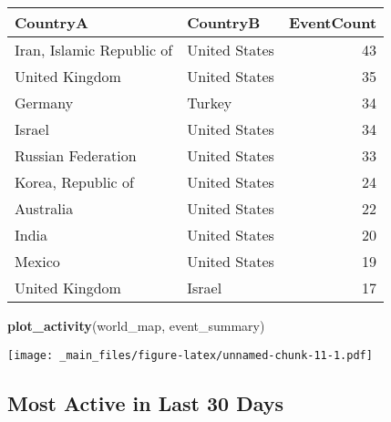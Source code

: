 \documentclass[]{article}
\newenvironment{Shaded}{\begin{snugshade}}{\end{snugshade}}
\newcommand{\KeywordTok}[1]{\textcolor[rgb]{0.13,0.29,0.53}{\textbf{{#1}}}}
\newcommand{\DataTypeTok}[1]{\textcolor[rgb]{0.13,0.29,0.53}{{#1}}}
\newcommand{\DecValTok}[1]{\textcolor[rgb]{0.00,0.00,0.81}{{#1}}}
\newcommand{\StringTok}[1]{\textcolor[rgb]{0.31,0.60,0.02}{{#1}}}
\newcommand{\NormalTok}[1]{{#1}}
\begin{document}
\begin{Shaded}
\end{Shaded}

\begin{tabular}{l|l|r}
\hline
CountryA & CountryB & EventCount\\
\hline
Iran, Islamic Republic of & United States & 43\\
\hline
United Kingdom & United States & 35\\
\hline
Germany & Turkey & 34\\
\hline
Israel & United States & 34\\
\hline
Russian Federation & United States & 33\\
\hline
Korea, Republic of & United States & 24\\
\hline
Australia & United States & 22\\
\hline
India & United States & 20\\
\hline
Mexico & United States & 19\\
\hline
United Kingdom & Israel & 17\\
\hline
\end{tabular}

\begin{Shaded}
\begin{Highlighting}[]
\KeywordTok{plot_activity}\NormalTok{(world_map, event_summary)}
\end{Highlighting}
\end{Shaded}

\texttt{[image: \_main\_files/figure-latex/unnamed-chunk-11-1.pdf]}

\subsection{Most Active in Last 30
Days}\label{most-active-in-last-30-days}

\begin{Shaded}
\end{Shaded}
\end{document}
